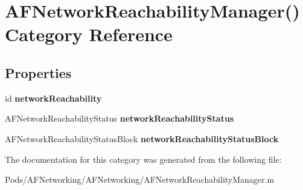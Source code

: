 \hypertarget{category_a_f_network_reachability_manager_07_08}{}\section{A\+F\+Network\+Reachability\+Manager() Category Reference}
\label{category_a_f_network_reachability_manager_07_08}
\subsection*{Properties}
\begin{DoxyCompactItemize}
\item 
\mbox{\label{category_a_f_network_reachability_manager_07_08_ae7f320bce7e90315495977207924094c}} 
id {\bfseries network\+Reachability}
\item 
\mbox{\label{category_a_f_network_reachability_manager_07_08_a95333765597b19f05573130cba7ad448}} 
A\+F\+Network\+Reachability\+Status {\bfseries network\+Reachability\+Status}
\item 
\mbox{\label{category_a_f_network_reachability_manager_07_08_a24af2821469a0c59e75544187a238502}} 
A\+F\+Network\+Reachability\+Status\+Block {\bfseries network\+Reachability\+Status\+Block}
\end{DoxyCompactItemize}


The documentation for this category was generated from the following file\+:\begin{DoxyCompactItemize}
\item 
Pods/\+A\+F\+Networking/\+A\+F\+Networking/A\+F\+Network\+Reachability\+Manager.\+m\end{DoxyCompactItemize}

